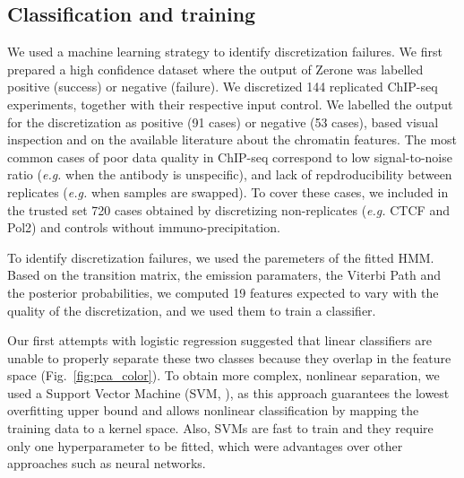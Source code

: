 \documentclass{bioinfo}
\begin{document}
\begin{methods}
\subsection{Classification and training}
\label{sub:training}
We used a machine learning strategy to identify discretization
failures. We first prepared a high confidence dataset where the
output of Zerone was labelled positive (success) or negative (failure).
We discretized 144 replicated ChIP-seq experiments, together with their
respective input control.
We labelled the output for the discretization as positive (91 cases)
or negative (53 cases), based visual inspection and on the available
literature about the chromatin features. The most common cases of
poor data quality in ChIP-seq correspond to low signal-to-noise ratio
(\textit{e.g.} when the antibody is unspecific), and lack of
repdroducibility between replicates (\textit{e.g.} when samples are
swapped). To cover these cases, we included in the trusted set
720 cases obtained by discretizing non-replicates
(\textit{e.g.} CTCF and Pol2) and controls without immuno-precipitation.

To identify discretization failures, we used the paremeters of the
fitted HMM. Based on the transition matrix, the emission paramaters,
the Viterbi Path and the posterior probabilities,
we computed 19 features expected to vary with the quality
of the discretization, and we used them to train a classifier.

Our first attempts with logistic regression suggested that linear
classifiers are unable to properly separate these two classes because
they overlap in the feature space (Fig.~\ref{fig:pca_color}). To obtain more
complex, nonlinear separation, we used a Support Vector Machine
(SVM, \citealp{Chang2011,e1071}), as this approach guarantees the lowest
overfitting upper bound and allows nonlinear classification by mapping
the training data to a kernel space. Also, SVMs are fast to train and
they require only one hyperparameter to be fitted, which were
advantages over other approaches such as neural networks.


\end{methods}
\end{document}
